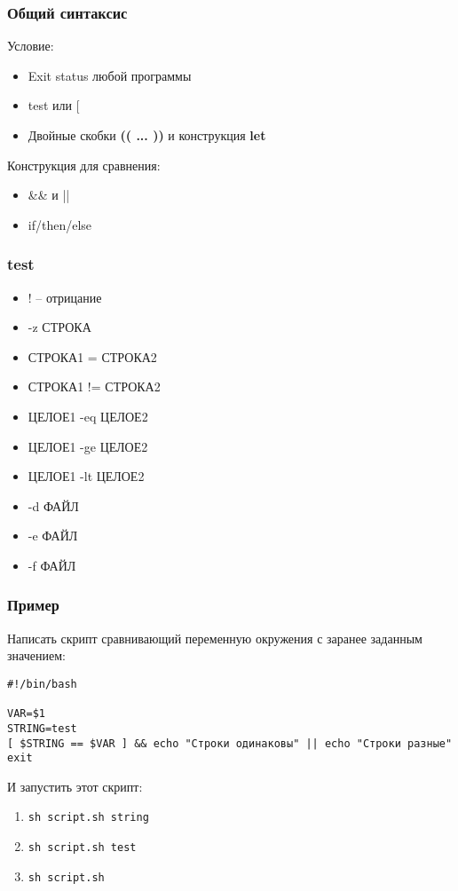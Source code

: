 
\begin{frame}
\frametitle{Общий синтаксис}

	Условие:
	\begin{itemize}
		\item Exit status любой программы
		\item test или $[$ 
		\item Двойные скобки {\bf (( ... ))} и конструкция {\bf let}
	\end{itemize}


	Конструкция для сравнения:
	\begin{itemize}
		\item \&\& и ||
		\item if/then/else
	\end{itemize}

\end{frame}


\begin{frame}[fragile]
\frametitle{test}

	\begin{itemize}
	    \item ! -- отрицание
	    \item -z СТРОКА
	    \item СТРОКА1 = СТРОКА2
	    \item СТРОКА1 != СТРОКА2
	    \item ЦЕЛОЕ1 -eq ЦЕЛОЕ2
	    \item ЦЕЛОЕ1 -ge ЦЕЛОЕ2
	    \item ЦЕЛОЕ1 -lt ЦЕЛОЕ2
	    \item -d ФАЙЛ
	    \item -e ФАЙЛ
	    \item -f ФАЙЛ
	\end{itemize}

\end{frame}


\begin{frame}[fragile]
\frametitle{Пример}

	Написать скрипт сравнивающий переменную окружения с заранее заданным значением:
	
	\small\begin{lstlisting}
#!/bin/bash

VAR=$1
STRING=test
[ $STRING == $VAR ] && echo "Строки одинаковы" || echo "Строки разные"
exit
	\end{lstlisting}
    \normalsize
	И запустить этот скрипт:
	
	\begin{enumerate}
		\item {\tt sh script.sh string}
		\item {\tt sh script.sh test}
		\item {\tt sh script.sh}
	\end{enumerate}

\end{frame}

